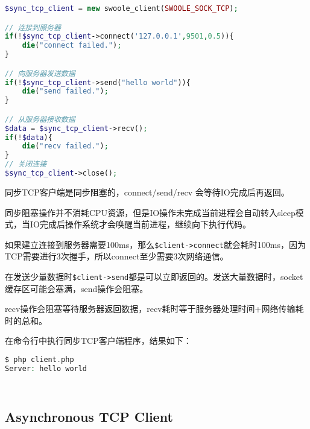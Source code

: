 \begin{lstlisting}[language=PHP]
$sync_tcp_client = new swoole_client(SWOOLE_SOCK_TCP);

// 连接到服务器
if(!$sync_tcp_client->connect('127.0.0.1',9501,0.5)){
	die("connect failed.");
}

// 向服务器发送数据
if(!$sync_tcp_client->send("hello world")){
	die("send failed.");
}

// 从服务器接收数据
$data = $sync_tcp_client->recv();
if(!$data){
	die("recv failed.");
}
// 关闭连接
$sync_tcp_client->close();
\end{lstlisting}

同步TCP客户端是同步阻塞的，connect/send/recv 会等待IO完成后再返回。

同步阻塞操作并不消耗CPU资源，但是IO操作未完成当前进程会自动转入sleep模式，当IO完成后操作系统才会唤醒当前进程，继续向下执行代码。

\begin{compactitem}
\item 如果建立连接到服务器需要100ms，那么\texttt{\$client->connect}就会耗时100ms，因为TCP需要进行3次握手，所以connect至少需要3次网络通信。
\item 在发送少量数据时\texttt{\$client->send}都是可以立即返回的。发送大量数据时，socket缓存区可能会塞满，send操作会阻塞。
\item recv操作会阻塞等待服务器返回数据，recv耗时等于服务器处理时间+网络传输耗时的总和。
\end{compactitem}

在命令行中执行同步TCP客户端程序，结果如下：

\begin{lstlisting}[language=PHP]
$ php client.php
Server: hello world
\end{lstlisting}



\begin{lstlisting}[language=PHP]

\end{lstlisting}




\begin{lstlisting}[language=PHP]

\end{lstlisting}



\subsection{Asynchronous TCP Client}

